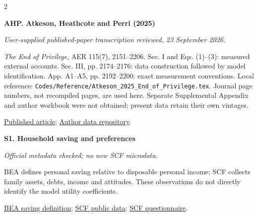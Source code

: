 \documentclass[10pt,a4paper,landscape]{article}
\newcommand{\code}[1]{{\footnotesize\texttt{#1}}}
\begin{document}
\begin{multicols}{2}\raggedright

\noindent\begin{minipage}{\linewidth}\raggedright

\hypertarget{src-AHP}{\textbf{AHP. Atkeson, Heathcote and Perri (2025)}}\par

{\footnotesize\itshape User-supplied published-paper transcription reviewed, 23 September 2026.}\par

\emph{The End of Privilege}, AER 115(7), 2151--2206. Sec. I and Eqs. (1)--(3): measured external accounts. Sec. III, pp. 2174--2176: data construction followed by model identification. App. A1--A5, pp. 2192--2200: exact measurement conventions. Local reference: \code{Codes/Reference/Atkeson\_2025\_End\_of\_Privilege.tex}. Journal page numbers, not recompiled pages, are used here. Separate Supplemental Appendix and author workbook were not obtained; present data retain their own vintages.

\par \href{https://doi.org/10.1257/aer.20230732}{Published article}; \href{https://doi.org/10.3886/E209797V1}{Author data repository}.

\end{minipage}\par\vspace{6pt}

\noindent\begin{minipage}{\linewidth}\raggedright

\hypertarget{src-S1}{\textbf{S1. Household saving and preferences}}\par

{\footnotesize\itshape Official metadata checked; no new SCF microdata.}\par

BEA defines personal saving relative to disposable personal income; SCF collects family assets, debts, income and attitudes. These observations do not directly identify the model utility coefficients.

\par \href{https://www.bea.gov/news/pio-release-additional-information}{BEA saving definition}; \href{https://www.federalreserve.gov/econres/scfindex.htm}{SCF public data}; \href{https://www.federalreserve.gov/econres/files/scfoutline.2022.pdf}{SCF questionnaire}.

\end{minipage}\par\vspace{6pt}


\end{multicols}
\end{document}
